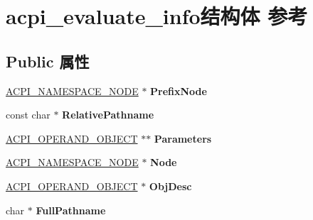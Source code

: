 \hypertarget{structacpi__evaluate__info}{}\section{acpi\+\_\+evaluate\+\_\+info结构体 参考}
\label{structacpi__evaluate__info}
\subsection*{Public 属性}
\begin{DoxyCompactItemize}
\item 
\mbox{\label{structacpi__evaluate__info_a1da2c8bff3add80331b0bbfaa164ca31}} 
\hyperlink{structacpi__namespace__node}{A\+C\+P\+I\+\_\+\+N\+A\+M\+E\+S\+P\+A\+C\+E\+\_\+\+N\+O\+DE} $\ast$ {\bfseries Prefix\+Node}
\item 
\mbox{\label{structacpi__evaluate__info_a0ec32fbdc26c4861710f2c48009e394c}} 
const char $\ast$ {\bfseries Relative\+Pathname}
\item 
\mbox{\label{structacpi__evaluate__info_aa9cbaf1ec3250a307985ec30840d8d67}} 
\hyperlink{unionacpi__operand__object}{A\+C\+P\+I\+\_\+\+O\+P\+E\+R\+A\+N\+D\+\_\+\+O\+B\+J\+E\+CT} $\ast$$\ast$ {\bfseries Parameters}
\item 
\mbox{\label{structacpi__evaluate__info_a7477949143ae9d51d0b268d98c5a26fb}} 
\hyperlink{structacpi__namespace__node}{A\+C\+P\+I\+\_\+\+N\+A\+M\+E\+S\+P\+A\+C\+E\+\_\+\+N\+O\+DE} $\ast$ {\bfseries Node}
\item 
\mbox{\label{structacpi__evaluate__info_a1619802f76184e0204658612f26ef021}} 
\hyperlink{unionacpi__operand__object}{A\+C\+P\+I\+\_\+\+O\+P\+E\+R\+A\+N\+D\+\_\+\+O\+B\+J\+E\+CT} $\ast$ {\bfseries Obj\+Desc}
\item 
\mbox{\label{structacpi__evaluate__info_af6d1a9d4c4cb300aac76316b04b4f6fe}} 
char $\ast$ {\bfseries Full\+Pathname}
\item 
\mbox{\label{structacpi__evaluate__info_aacd68fd2aaf1b8d74172b1bf2df12529}} 
$$
\end{DoxyCompactItemize}

